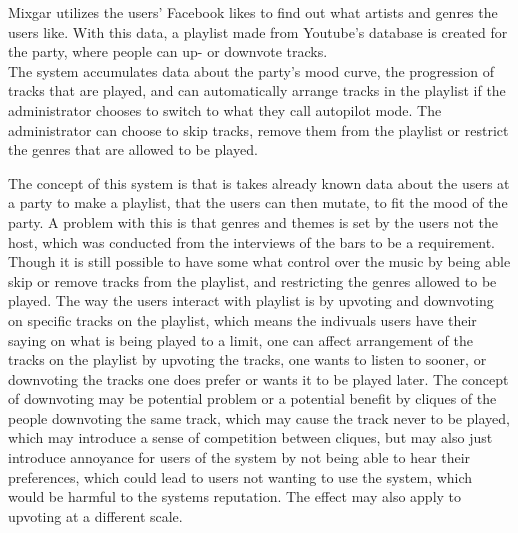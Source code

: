 Mixgar utilizes the users' Facebook likes to find out what artists and genres the users like. With this data, a playlist made from Youtube's database is created for the party, where people can up- or downvote tracks.\\

The system accumulates data about the party's mood curve, the progression of tracks that are played, and can automatically arrange tracks in the playlist if the administrator chooses to switch to what they call autopilot mode.
The administrator can choose to skip tracks, remove them from the playlist or restrict the genres that are allowed to be played.

The concept of this system is that is takes already known data about the users at a party to make a playlist, that the users can then mutate, to fit the mood of the party. A problem with this is that genres and themes is set by the users not the host, which was conducted from the interviews of the bars to be a requirement. Though it is still possible to have some what control over the music by being able skip or remove tracks from the playlist, and restricting the genres allowed to be played. The way the users interact with playlist is by upvoting and downvoting on specific tracks on the playlist, which means the indivuals users have their saying on what is being played to a limit, one can affect arrangement of the tracks on the playlist by upvoting the tracks, one wants to listen to sooner, or downvoting the tracks one does prefer or wants it to be played later. The concept of downvoting may be potential problem or a potential benefit by cliques of the people downvoting the same track, which may cause the track never to be played, which may introduce a sense of competition between cliques, but may also just introduce annoyance for users of the system by not being able to hear their preferences, which could lead to users not wanting to use the system, which would be harmful to the systems reputation. The effect may also apply to upvoting at a different scale.
